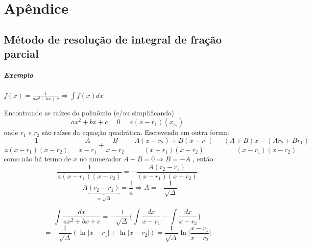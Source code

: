 \documentclass[letterpaper, 12pt]{book}
\begin{document}
\chapter*{Apêndice}
\section{Método de resolução de integral de fração parcial}
\paragraph{Exemplo} \( f(x) = \frac{1}{ax^2 + bx + c} \Rightarrow \int f(x) dx \) 

Encontrando as raízes do polinômio (e/ou simplificando)
\[ ax^2 + bx + c = 0 = a(x-r_1)(x_r_2) \]
onde \( r_1 \) e \( r_2 \) são raízes da equação quadrática.
Escrevendo em outra forma:
\[ \frac{1}{a(x-r_1)(x-r_2)} = \frac{A}{x-r_1} + \frac{B}{x-r_2} = \frac{A(x-r_2) +
    B(x-r_1)}{(x-r_1)(x-r_2)} = \frac{(A+B)x - (Ar_2 + Br_1)}{(x-r_1)(x-r_2)} \]
como não há termo de \( x \)  no numerador \( A + B = 0 \Rightarrow B = -A \) , então
\[ \frac{1}{a(x-r_1)(x- r_2)} = - \frac{A(r_2 - r_1)}{(x-r_1)(x - r_2)} \]
\[ -A \underbrace{(r_2 - r_1)}_{= \sqrt{\Delta}} = \frac{1}{a} \Rightarrow A = - \frac{1}{\sqrt{\Delta}}\]

\[ \int \frac{dx}{ax^2 + bx + c} = - \frac{1}{\sqrt{\Delta}} \bigg\{ \int \frac{dx}{x - r_1} - \int \frac{dx}{x - r_2} \bigg\} \]
\[ = - \frac{1}{\sqrt{\Delta}} \left( \ln |x - r_1| + \ln | x - r_2 | \right) = \frac{1}{\sqrt{\Delta}} \ln
  \bigg|\frac{x - r_1}{x - r_2} \bigg| \]


\nocite{*}
\printbibliography
\end{document}
